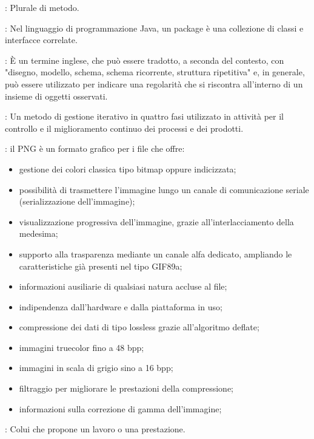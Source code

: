 {		%
		: Plurale di metodo.
		

		: Nel linguaggio di programmazione Java, un package è una collezione di classi e interfacce correlate.
		
		: È un termine inglese, che può essere tradotto, a seconda del contesto, con "disegno, modello, schema, schema ricorrente, struttura ripetitiva" e, in generale, può essere utilizzato per indicare una regolarità che si riscontra all'interno di un insieme di oggetti osservati.
		
		: Un metodo di gestione iterativo in quattro fasi utilizzato in attività per il controllo e il miglioramento continuo dei processi e dei prodotti.
		
		: il PNG è un formato grafico per i file che offre:
  			\begin{itemize}
    		\item gestione dei colori classica tipo bitmap oppure indicizzata;
    		\item possibilità di trasmettere l'immagine lungo un canale di comunicazione seriale (serializzazione dell'immagine);
   			\item visualizzazione progressiva dell'immagine, grazie all'interlacciamento della medesima;
    		\item supporto alla trasparenza mediante un canale alfa dedicato, ampliando le caratteristiche già presenti nel tipo GIF89a;
    		\item informazioni ausiliarie di qualsiasi natura accluse al file;
    		\item indipendenza dall'hardware e dalla piattaforma in uso;
    		\item compressione dei dati di tipo lossless grazie all'algoritmo deflate;
    		\item immagini truecolor fino a 48 bpp;
    		\item immagini in scala di grigio sino a 16 bpp;
    		\item filtraggio per migliorare le prestazioni della compressione;
    		\item informazioni sulla correzione di gamma dell'immagine;
  			\end{itemize}
			
		: Colui che propone un lavoro o una prestazione.	
		

}
